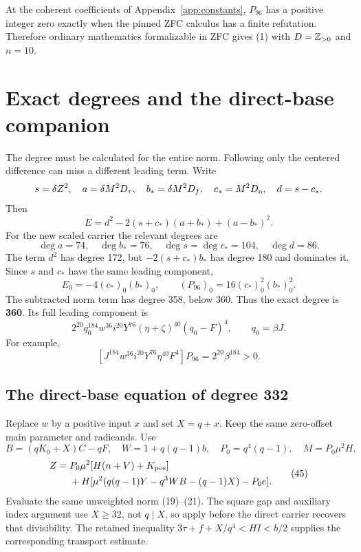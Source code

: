 \begin{corollary}
At the coherent coefficients of Appendix~\ref{app:constants},
$P_{96}$ has a positive integer zero exactly when the pinned ZFC calculus
has a finite refutation. Therefore ordinary mathematics formalizable in
ZFC gives (1) with $D=\mathbb Z_{>0}$ and $n=10$.
\end{corollary}

\section{Exact degrees and the direct-base companion}
\label{sec:degree}

The degree must be calculated for the entire norm. Following only the
centered difference can miss a different leading term. Write
\[
s=\delta Z^2,\quad a=\delta M^2D_\tau,\quad
b_*=\delta M^2D_f,\quad c_*=M^2D_{\rm n},\quad d=s-c_*.
\]
Then
\[
E=d^2-2(s+c_*)(a+b_*)+(a-b_*)^2.
\tag{41}
\]
For the new scaled carrier the relevant degrees are
\[
\deg a=74,\quad\deg b_*=76,\quad
\deg s=\deg c_*=104,\quad\deg d=86.
\]
The term $d^2$ has degree 172, but $-2(s+c_*)b_*$ has degree 180
and dominates it. Since $s$ and $c_*$ have the same leading component,
\[
E_0=-4(c_*)_0(b_*)_0,\qquad
(P_{96})_0=16(c_*)_0^2(b_*)_0^2.
\tag{42}
\]
The subtracted norm term has degree 358, below 360.
Thus the exact degree is \textbf{360}.
Its full leading component is
\[
2^{20}q_0^{184}w^{36}i^{20}Y^{76}
(\eta+\zeta)^{40}(q_0-F)^4,\qquad q_0=\beta J.
\tag{43}
\]
For example,
\[
[J^{184}w^{36}i^{20}Y^{76}\eta^{40}F^4]P_{96}
=2^{20}\beta^{184}>0.
\tag{44}
\]

\subsection{The direct-base equation of degree 332}

Replace $w$ by a positive input $x$ and set $X=q+x$.
Keep the same zero-offset main parameter and radicands. Use
\[
B=(qK_0+X)C-qF,\quad W=1+q(q-1)b,\quad
P_0=q^4(q-1),\quad M=P_0\mu^2H,
\]
\[
\begin{split}
Z={}&P_0\mu^2[H(n+V)+K_{\rm pos}]\\
&+H[\mu^2(q(q-1)Y-q^3WB-(q-1)X)-P_0e].
\end{split}
\tag{45}
\]
Evaluate the same unweighted norm (19)--(21).
The square gap and auxiliary index argument use $X\ge32$, not $q\mid X$,
so apply before the direct carrier recovers that divisibility.
The retained inequality $3\tau+f+X/q^4<HI<b/2$ supplies the corresponding
transport estimate.

